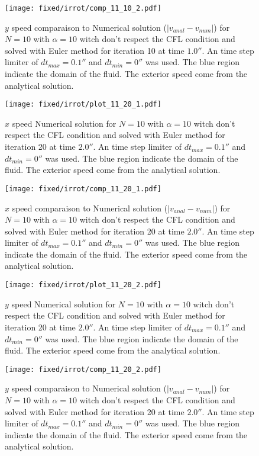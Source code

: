 \begin{figure}
\texttt{[image: fixed/irrot/comp\_11\_10\_2.pdf]}
\caption{$y$ speed comparaison to Numerical solution ($|v_{anal}-v_{num}|$) for $N=10$ with $\alpha=10$ witch don't respect the CFL condition and solved with Euler method
for iteration 10 at time $\unit{1.0}{\second}$.
An time step limiter of $dt_{max}=\unit{0.1}{\second}$ and $dt_{min}=\unit{0}{\second}$ was used.
The blue region indicate the domain of the fluid. The exterior speed come from the analytical solution.
\label{fix:comp_11_10_2}
}
\end{figure}

\begin{figure}
\texttt{[image: fixed/irrot/plot\_11\_20\_1.pdf]}
\caption{$x$ speed Numerical solution for $N=10$ with $\alpha=10$ witch don't respect the CFL condition and solved with Euler method
for iteration 20 at time $\unit{2.0}{\second}$.
An time step limiter of $dt_{max}=\unit{0.1}{\second}$ and $dt_{min}=\unit{0}{\second}$ was used.
The blue region indicate the domain of the fluid. The exterior speed come from the analytical solution.
\label{fix:plot_11_20_1}
}
\end{figure}

\begin{figure}
\texttt{[image: fixed/irrot/comp\_11\_20\_1.pdf]}
\caption{$x$ speed comparaison to Numerical solution ($|v_{anal}-v_{num}|$) for $N=10$ with $\alpha=10$ witch don't respect the CFL condition and solved with Euler method
for iteration 20 at time $\unit{2.0}{\second}$.
An time step limiter of $dt_{max}=\unit{0.1}{\second}$ and $dt_{min}=\unit{0}{\second}$ was used.
The blue region indicate the domain of the fluid. The exterior speed come from the analytical solution.
\label{fix:comp_11_20_1}
}
\end{figure}

\clearpage

\begin{figure}
\texttt{[image: fixed/irrot/plot\_11\_20\_2.pdf]}
\caption{$y$ speed Numerical solution for $N=10$ with $\alpha=10$ witch don't respect the CFL condition and solved with Euler method
for iteration 20 at time $\unit{2.0}{\second}$.
An time step limiter of $dt_{max}=\unit{0.1}{\second}$ and $dt_{min}=\unit{0}{\second}$ was used.
The blue region indicate the domain of the fluid. The exterior speed come from the analytical solution.
\label{fix:plot_11_20_2}
}
\end{figure}

\begin{figure}
\texttt{[image: fixed/irrot/comp\_11\_20\_2.pdf]}
\caption{$y$ speed comparaison to Numerical solution ($|v_{anal}-v_{num}|$) for $N=10$ with $\alpha=10$ witch don't respect the CFL condition and solved with Euler method
for iteration 20 at time $\unit{2.0}{\second}$.
An time step limiter of $dt_{max}=\unit{0.1}{\second}$ and $dt_{min}=\unit{0}{\second}$ was used.
The blue region indicate the domain of the fluid. The exterior speed come from the analytical solution.
\label{fix:comp_11_20_2}
}
\end{figure}

